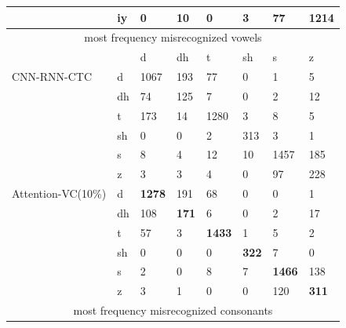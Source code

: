 \documentclass[a4paper]{article}
\begin{document}
\begin{table}[H]
{\begin{tabular}{llllllll}
                   & iy                   & 0             & 10            & 0             & 3            & 77            & \textbf{1214} \\ \hline
\multicolumn{8}{c}{most frequency misrecognized vowels}                                                                                  \\ \hline
                   &                      & d             & dh            & t             & sh           & s             & z             \\
CNN-RNN-CTC        & d                    & 1067          & 193           & 77            & 0            & 1             & 5             \\
                   & dh                   & 74            & 125           & 7             & 0            & 2             & 12            \\
                   & t                    & 173           & 14            & 1280          & 3            & 8             & 5             \\
                   & sh                   & 0             & 0             & 2             & 313          & 3             & 1             \\
                   & s                    & 8             & 4             & 12            & 10           & 1457          & 185           \\
                   & z                    & 3             & 3             & 4             & 0            & 97            & 228           \\
Attention-VC(10\%) & d                    & \textbf{1278} & 191           & 68            & 0            & 0             & 1             \\
                   & dh                   & 108           & \textbf{171}  & 6             & 0            & 2             & 17            \\
                   & t                    & 57            & 3             & \textbf{1433} & 1            & 5             & 2             \\
                   & sh                   & 0             & 0             & 0             & \textbf{322} & 7             & 0             \\
                   & s                    & 2             & 0             & 8             & 7            & \textbf{1466} & 138           \\
                   & z                    & 3             & 1             & 0             & 0            & 120           & \textbf{311}  \\ \hline
\multicolumn{8}{c}{most frequency misrecognized consonants}                                                                              \\ \hline
\end{tabular}%
}
\end{table}
\end{document}
